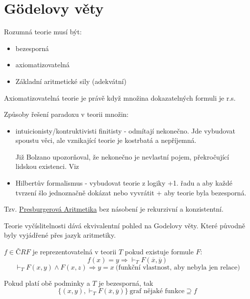 \section{\texorpdfstring{G\"{o}delovy věty}{G\"{o}delovy věty}}
\vspace{5mm}
\large

\begin{definition}
	Rozumná teorie musí být:
	\begin{itemize}
		\item bezesporná
		\item axiomatizovatelná
		\item Základní aritmetické sily (adekvátní)
	\end{itemize}
\end{definition}

\begin{definition}
	Axiomatizovatelná teorie je právě když množina dokazatelných formuli je r.s.
\end{definition}

Způsoby řešení paradoxu v teorii množin:
\begin{itemize}
	\item intuicionisty/kontruktivisti finitisty - odmítají nekonečno.
		Jde vybudovat spoustu věci, ale vznikající teorie je kostrbatá a nepříjemná.

		Již Bolzano upozorňoval, že nekonečno je nevlastní pojem, překročující lidskou existenci. Viz ~\cite{bolzano2014paradoxes}
	\item Hilbertův formalismus - vybudovat teorie z logiky +1. řadu a aby každé tvrzení šlo jednoznačně dokázat nebo vyvrátit + aby teorie byla bezesporná.
\end{itemize}


\begin{note}
	Tzv. \href{https://en.wikipedia.org/wiki/Presburger_arithmetic}{Presburgerová Aritmetika}  bez násobení je rekurzivní a konzistentní.
\end{note}

\begin{note}
	Teorie vyčíslitelnosti dává ekvivalentní pohled na Godelovy věty. Které původně byly vyjádřené přes jazyk aritmetiky.
\end{note}

\begin{definition}[Reprezentovatelnost]
	$f \in ČRF$ je reprezentovatelná v teorii $T$ pokud existuje formule $F$:
	\[ f(x) = y \Rightarrow \vdash_T F(\overline{x}, \overline{y}) \]
	\[ \vdash_T F(x, y) \land F(x, z) \Rightarrow y = x\ \text{(funkční vlastnost, aby nebyla jen relace)} \]

	Pokud platí obě podminky a $T$ je bezesporná, tak
	\[ \{ (x, y), \vdash_T F(\overline{x}, \overline{y}) \}\ \text{graf nějaké funkce} \supseteq f \]
\end{definition}

